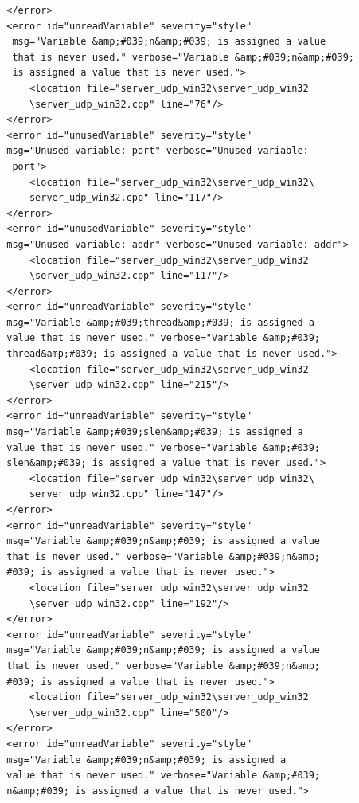 \documentclass[10pt,a4paper]{report}
\begin{document}
\begin{lstlisting}
        </error>
        <error id="unreadVariable" severity="style"
         msg="Variable &amp;#039;n&amp;#039; is assigned a value 
         that is never used." verbose="Variable &amp;#039;n&amp;#039;
         is assigned a value that is never used.">
            <location file="server_udp_win32\server_udp_win32
            \server_udp_win32.cpp" line="76"/>
        </error>
        <error id="unusedVariable" severity="style" 
        msg="Unused variable: port" verbose="Unused variable:
         port">
            <location file="server_udp_win32\server_udp_win32\
            server_udp_win32.cpp" line="117"/>
        </error>
        <error id="unusedVariable" severity="style" 
        msg="Unused variable: addr" verbose="Unused variable: addr">
            <location file="server_udp_win32\server_udp_win32
            \server_udp_win32.cpp" line="117"/>
        </error>
        <error id="unreadVariable" severity="style" 
        msg="Variable &amp;#039;thread&amp;#039; is assigned a 
        value that is never used." verbose="Variable &amp;#039;
        thread&amp;#039; is assigned a value that is never used.">
            <location file="server_udp_win32\server_udp_win32
            \server_udp_win32.cpp" line="215"/>
        </error>
        <error id="unreadVariable" severity="style" 
        msg="Variable &amp;#039;slen&amp;#039; is assigned a 
        value that is never used." verbose="Variable &amp;#039;
        slen&amp;#039; is assigned a value that is never used.">
            <location file="server_udp_win32\server_udp_win32\
            server_udp_win32.cpp" line="147"/>
        </error>
        <error id="unreadVariable" severity="style" 
        msg="Variable &amp;#039;n&amp;#039; is assigned a value 
        that is never used." verbose="Variable &amp;#039;n&amp;
        #039; is assigned a value that is never used.">
            <location file="server_udp_win32\server_udp_win32
            \server_udp_win32.cpp" line="192"/>
        </error>
        <error id="unreadVariable" severity="style" 
        msg="Variable &amp;#039;n&amp;#039; is assigned a value 
        that is never used." verbose="Variable &amp;#039;n&amp;
        #039; is assigned a value that is never used.">
            <location file="server_udp_win32\server_udp_win32
            \server_udp_win32.cpp" line="500"/>
        </error>
        <error id="unreadVariable" severity="style" 
        msg="Variable &amp;#039;n&amp;#039; is assigned a 
        value that is never used." verbose="Variable &amp;#039;
        n&amp;#039; is assigned a value that is never used.">

\end{lstlisting}
\end{document}
